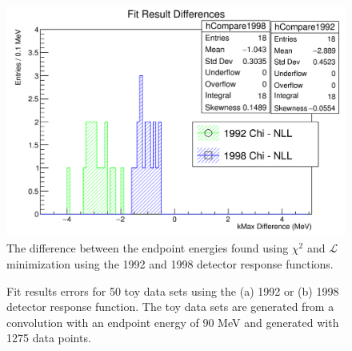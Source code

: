 \begin{figure}[h]
  \centering
  \includegraphics[width=\linewidth]{figures/png/compare_fit_results_92_v_98_unrestrictedOnly.png}
  \caption{The difference between the endpoint energies found using $\chi^2$ and
    $\mathcal{L}$ minimization using the 1992 and 1998 detector response functions.}
  \label{fig:compareFits}
\end{figure}

\begin{figure}[h]
  \centering
  \hfill
  \caption{Fit results errors for 50 toy data sets using the (a) 1992 or (b) 1998 detector response function.
    The toy data sets are generated from a convolution with an endpoint energy of 90 MeV and generated
    with 1275 data points.
  }
  \label{fig:ToyFitErrs}
\end{figure}

